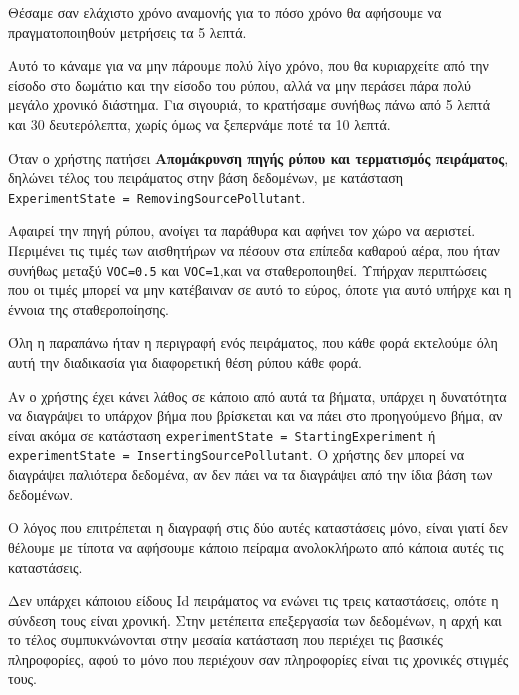 Θέσαμε σαν ελάχιστο χρόνο αναμονής για το πόσο χρόνο θα αφήσουμε να
πραγματοποιηθούν μετρήσεις τα 5 λεπτά.

Αυτό το κάναμε για να μην πάρουμε πολύ λίγο χρόνο, που θα κυριαρχείτε από την είσοδο στο δωμάτιο και την είσοδο του
ρύπου, αλλά να μην περάσει πάρα πολύ μεγάλο χρονικό διάστημα.
Για σιγουριά, το κρατήσαμε συνήθως πάνω από 5 λεπτά και 30 δευτερόλεπτα, χωρίς όμως
να ξεπερνάμε ποτέ τα 10 λεπτά.

Όταν ο χρήστης πατήσει \textbf{Απομάκρυνση πηγής ρύπου και τερματισμός
πειράματος}, δηλώνει τέλος του πειράματος στην βάση δεδομένων,
με κατάσταση \linebreak
\texttt{ExperimentState = RemovingSourcePollutant}.

Αφαιρεί την πηγή ρύπου, ανοίγει τα παράθυρα και αφήνει τον χώρο να αεριστεί.
Περιμένει τις τιμές των αισθητήρων να πέσουν στα επίπεδα καθαρού αέρα,
που ήταν συνήθως μεταξύ \texttt{VOC=0.5} και \texttt{VOC=1},και να σταθεροποιηθεί.
Υπήρχαν περιπτώσεις που οι τιμές μπορεί να μην κατέβαιναν σε αυτό το εύρος, όποτε για
αυτό υπήρχε και η έννοια της σταθεροποίησης.

Όλη η παραπάνω ήταν η περιγραφή ενός πειράματος, που κάθε φορά εκτελούμε όλη αυτή
την διαδικασία για διαφορετική θέση ρύπου κάθε φορά.

Αν ο χρήστης έχει κάνει λάθος σε κάποιο από αυτά τα βήματα,
υπάρχει η δυνατότητα να διαγράψει το υπάρχον βήμα που βρίσκεται και να πάει στο
προηγούμενο βήμα, αν είναι ακόμα σε κατάσταση
\texttt{experimentState = StartingExperiment} ή
\texttt{experimentState = InsertingSourcePollutant}.
Ο χρήστης δεν μπορεί να διαγράψει παλιότερα δεδομένα, αν δεν πάει να τα διαγράψει από
την ίδια βάση των δεδομένων.

Ο λόγος που επιτρέπεται η διαγραφή στις δύο αυτές καταστάσεις μόνο, είναι γιατί δεν
θέλουμε με τίποτα να αφήσουμε κάποιο πείραμα
ανολοκλήρωτο από κάποια αυτές τις καταστάσεις.

Δεν υπάρχει κάποιου είδους Id πειράματος να ενώνει τις τρεις καταστάσεις, οπότε η
σύνδεση τους είναι χρονική.
Στην μετέπειτα επεξεργασία των δεδομένων, η αρχή και το τέλος συμπυκνώνονται στην
μεσαία κατάσταση που περιέχει τις βασικές πληροφορίες,
αφού το μόνο που περιέχουν σαν πληροφορίες είναι τις χρονικές στιγμές τους.

\FloatBarrier